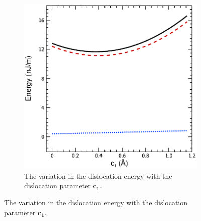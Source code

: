 \begin{figure}
\begin{subfigure}{0.4\textwidth}
\includegraphics[width=\textwidth]{U_vs_c1}
\caption{The variation in the dislocation energy with the dislocation parameter $\mathbf{c_1}$.}
\end{subfigure}


\end{figure}
